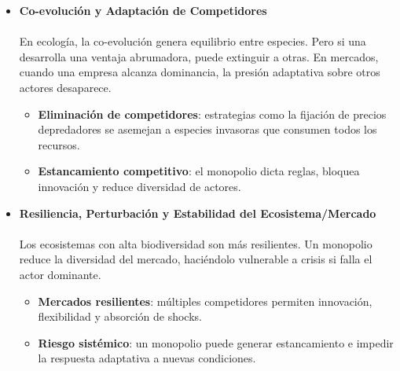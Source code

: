 \documentclass[a4paper,12pt]{article}
\begin{document}
\begin{itemize}
    \begin{itemize}
        \item \textbf{Monopolios naturales}: redes de servicios públicos donde sería ineficiente duplicar la infraestructura.
        \item \textbf{Ventaja de costo}: Amazon domina logística y precios gracias a su escala, excluyendo a pequeños competidores.
    \end{itemize}

    \item \textbf{Co-evolución y Adaptación de Competidores}

    \paragraph{}En ecología, la co-evolución genera equilibrio entre especies. Pero si una desarrolla una ventaja abrumadora, puede extinguir a otras. En mercados, cuando una empresa alcanza dominancia, la presión adaptativa sobre otros actores desaparece.

    \begin{itemize}
        \item \textbf{Eliminación de competidores}: estrategias como la fijación de precios depredadores se asemejan a especies invasoras que consumen todos los recursos.
        \item \textbf{Estancamiento competitivo}: el monopolio dicta reglas, bloquea innovación y reduce diversidad de actores.
    \end{itemize}

    \item \textbf{Resiliencia, Perturbación y Estabilidad del Ecosistema/Mercado}

    \paragraph{}Los ecosistemas con alta biodiversidad son más resilientes. Un monopolio reduce la diversidad del mercado, haciéndolo vulnerable a crisis si falla el actor dominante.

    \begin{itemize}
        \item \textbf{Mercados resilientes}: múltiples competidores permiten innovación, flexibilidad y absorción de shocks.
        \item \textbf{Riesgo sistémico}: un monopolio puede generar estancamiento e impedir la respuesta adaptativa a nuevas condiciones.
    \end{itemize}
\end{itemize}
\end{document}
